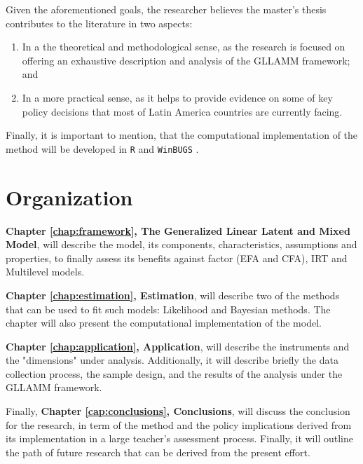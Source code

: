 \noindent Given the aforementioned goals, the researcher believes the master's thesis contributes to the literature in two aspects: 

\begin{enumerate}
	\item In a the theoretical and methodological sense, as the research is focused on offering an exhaustive description and analysis of the GLLAMM framework; and 
	
	\item In a more practical sense, as it helps to provide evidence on some of key policy decisions that most of Latin America countries are currently facing.
\end{enumerate}

\noindent Finally, it is important to mention, that the computational implementation of the method will be developed in {\color{red} \texttt{R}} \cite{R2015} and {\color{red}\texttt{WinBUGS}} \cite{Lunn_et_al_2000}.



\section{Organization}

\textbf{Chapter \ref{chap:framework}, The Generalized Linear Latent and Mixed Model}, will describe the model, its components, characteristics, assumptions and properties, to finally assess its benefits against factor (EFA and CFA), IRT and Multilevel models.

\textbf{Chapter \ref{chap:estimation}, Estimation}, will describe {\color{red} two} of the methods that can be used to fit such models: {\color{red} Likelihood and Bayesian methods}. The chapter will also present the computational implementation of the model.

\textbf{Chapter \ref{chap:application}, Application}, will describe the instruments and the "dimensions" under analysis. Additionally, it will describe briefly the data collection process, the sample design, and the results of the analysis under the GLLAMM framework.

Finally, \textbf{Chapter \ref{cap:conclusions}, Conclusions}, will discuss the conclusion for the research, in term of the method and the policy implications derived from its implementation in a large teacher's assessment process. Finally, it will outline the path of future research that can be derived from the present effort.
